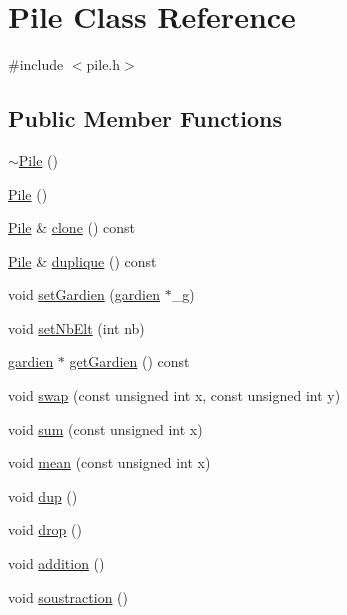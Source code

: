 \hypertarget{class_pile}{\section{Pile Class Reference}
\label{class_pile}
}


{\ttfamily \#include $<$pile.\-h$>$}

\subsection*{Public Member Functions}
\begin{DoxyCompactItemize}
\item 
\hyperlink{class_pile_ab2d1398d675586ff34994e2b109df152}{$\sim$\-Pile} ()
\item 
\hyperlink{class_pile_ab44e927107b28f5f3ac7697d10e0a739}{Pile} ()
\item 
\hyperlink{class_pile}{Pile} \& \hyperlink{class_pile_a13e1620ba0de2d1cd4b1f66f5356a8b4}{clone} () const 
\item 
\hyperlink{class_pile}{Pile} \& \hyperlink{class_pile_aee5282e29d14470c8805b62830207306}{duplique} () const 
\item 
void \hyperlink{class_pile_aace6210d258170c7420d6a4bda5ec967}{set\-Gardien} (\hyperlink{classgardien}{gardien} $\ast$\-\_\-g)
\item 
void \hyperlink{class_pile_a09fd751d9d6d0d3c861f97405756db56}{set\-Nb\-Elt} (int nb)
\item 
\hyperlink{classgardien}{gardien} $\ast$ \hyperlink{class_pile_af610383f7aa4076d56646753de61bdc6}{get\-Gardien} () const 
\item 
void \hyperlink{class_pile_a667e4bd3ec87f598cac5f5c761bd1623}{swap} (const unsigned int x, const unsigned int y)
\item 
void \hyperlink{class_pile_ab2671569b6870d06fb94179e998e2e2e}{sum} (const unsigned int x)
\item 
void \hyperlink{class_pile_a3993e0e33e78011663b15b9eb723d456}{mean} (const unsigned int x)
\item 
void \hyperlink{class_pile_a081f7843d01cae1f0f7be7d92e46d5d2}{dup} ()
\item 
void \hyperlink{class_pile_a7488ed257c6ceb16ed57a9fffb0726d5}{drop} ()
\item 
void \hyperlink{class_pile_a2f7afa189e97a23a836f07f9898538cf}{addition} ()
\item 
void \hyperlink{class_pile_ab1827b113fff2c3fa59ebbe4c5902b1b}{soustraction} ()
\item 

\end{DoxyCompactItemize}
